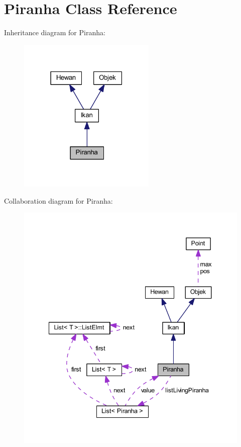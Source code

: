 \hypertarget{class_piranha}{}\section{Piranha Class Reference}
\label{class_piranha}


Inheritance diagram for Piranha\+:\nopagebreak
\begin{figure}[H]
\begin{center}
\leavevmode
\includegraphics[width=186pt]{class_piranha__inherit__graph}
\end{center}
\end{figure}


Collaboration diagram for Piranha\+:\nopagebreak
\begin{figure}[H]
\begin{center}
\leavevmode
\includegraphics[width=342pt]{class_piranha__coll__graph}
\end{center}
\end{figure}
